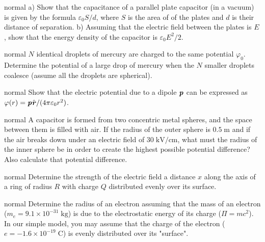 \hypertarget{P92}{}
\begin{solution}{normal} %
a) Show that the capacitance of a parallel plate capacitor (in a vacuum) is given by the formula $\varepsilon_0 S/d$, where $S$ is the area of of the plates and $d$ is their distance of separation. b) Assuming that the electric field between the plates is $E$, show that the energy density of the capacitor is $\varepsilon_0 E^2/2$.
\end{solution}

\hypertarget{P93}{}
\begin{solution}{normal} %
$N$ identical droplets of mercury are charged to the same potential  $\varphi_0$. Determine the potential of a large drop of mercury when the $N$ smaller droplets coalesce (assume all the droplets are spherical).
\end{solution}

\hypertarget{P94}{}
\begin{solution}{normal} %
Show that the electric potential due to a dipole $\textbf{\textit{p}}$ can be expressed as $\varphi(r)=\textbf{\textit{p}}\hat{\textbf{\textit{r}}}/(4\pi\varepsilon_0r^2)$.
\end{solution}

\hypertarget{P95}{}
\begin{solution}{normal} %
A capacitor is formed from two concentric metal spheres, and the space between them is filled with air. If the radius of the outer sphere is $0.5\;\text{m}$ and if the air breaks down under an electric field of $30\;\text{kV}/\text{cm}$, what must the radius of the inner sphere be in order to create the highest possible potential difference? Also calculate that potential difference.
\end{solution}

\hypertarget{P96}{}
\begin{solution}{normal} %
Determine the strength of the electric field a distance $x$ along the axis of a ring of radius $R$ with charge $Q$ distributed evenly over its surface.
\end{solution}

\hypertarget{P97}{}
\begin{solution}{normal} %
Determine the radius of an electron assuming that the mass of an electron ($m_e=9.1\times10^{-31}\;\text{kg}$) is due to the electrostatic energy of its charge ($\Pi=mc^2$). In our simple model, you may assume that the charge of the electron ($e=-1.6\times10^{-19}\;\text{C}$) is evenly distributed over its "surface". 
\end{solution}

